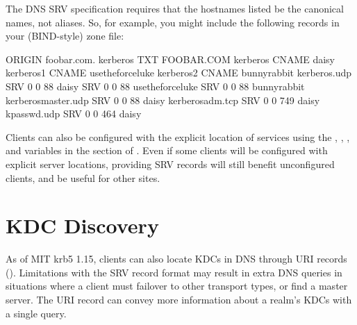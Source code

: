 \documentclass[letterpaper,10pt,english]{sphinxmanual}
\begin{document}
The DNS SRV specification requires that the hostnames listed be the
canonical names, not aliases.  So, for example, you might include the
following records in your (BIND-style) zone file:

%
\begin{sphinxVerbatim}[commandchars=\\\{\}]
\PYGZdl{}ORIGIN foobar.com.
\PYGZus{}kerberos               TXT       \PYGZdq{}FOOBAR.COM\PYGZdq{}
kerberos                CNAME     daisy
kerberos\PYGZhy{}1              CNAME     use\PYGZhy{}the\PYGZhy{}force\PYGZhy{}luke
kerberos\PYGZhy{}2              CNAME     bunny\PYGZhy{}rabbit
\PYGZus{}kerberos.\PYGZus{}udp          SRV       0 0 88 daisy
                        SRV       0 0 88 use\PYGZhy{}the\PYGZhy{}force\PYGZhy{}luke
                        SRV       0 0 88 bunny\PYGZhy{}rabbit
\PYGZus{}kerberos\PYGZhy{}master.\PYGZus{}udp   SRV       0 0 88 daisy
\PYGZus{}kerberos\PYGZhy{}adm.\PYGZus{}tcp      SRV       0 0 749 daisy
\PYGZus{}kpasswd.\PYGZus{}udp           SRV       0 0 464 daisy
\end{sphinxVerbatim}

Clients can also be configured with the explicit location of services
using the , , , and
 variables in the {\hyperref[\detokenize{admin/conf_files/krb5_conf:realms}]{}} section of
{\hyperref[\detokenize{admin/conf_files/krb5_conf:krb5-conf-5}]{}}.  Even if some clients will be configured with
explicit server locations, providing SRV records will still benefit
unconfigured clients, and be useful for other sites.


\section{KDC Discovery}
\label{\detokenize{admin/realm_config:kdc-discovery}}\label{\detokenize{admin/realm_config:id1}}
As of MIT krb5 1.15, clients can also locate KDCs in DNS through URI
records ().  Limitations with the SRV record format may
result in extra DNS queries in situations where a client must failover
to other transport types, or find a master server.  The URI record can
convey more information about a realm’s KDCs with a single query.
\end{document}

